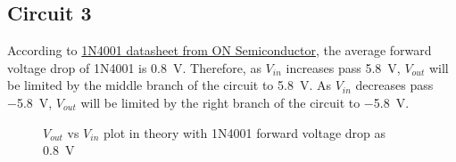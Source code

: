 \documentclass{article}
\begin{document}
\newpage

\subsection*{Circuit 3}

According to \href{https://www.onsemi.com/pub/Collateral/1N4001-D.PDF}{1N4001 datasheet from ON Semiconductor}, the average forward voltage drop of 1N4001 is \SI{0.8}{\volt}. Therefore, as $V_{in}$ increases pass \SI{5.8}{\volt}, $V_{out}$ will be limited by the middle branch of the circuit to \SI{5.8}{\volt}. As $V_{in}$ decreases pass \SI{-5.8}{\volt}, $V_{out}$ will be limited by the right branch of the circuit to \SI{-5.8}{\volt}.
\begin{figure}[H]
  \centering
  \begin{adjustbox}{max width=\textwidth}
\end{adjustbox}
\caption{$V_{out}$ vs $V_{in}$ plot in theory with 1N4001 forward voltage drop as \SI{0.8}{\volt}}
\end{figure}
\end{document}
